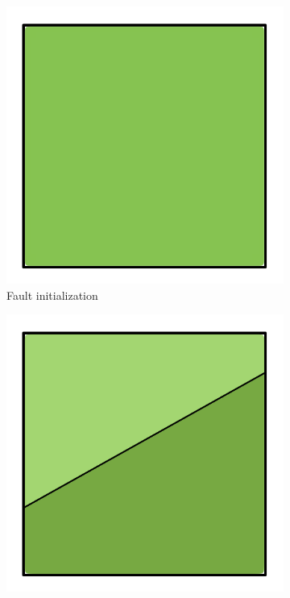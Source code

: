 \documentclass[11pt,a4paper,twoside,openright]{report}
\begin{document}
\begin{figure}[h]
  \centering
  \begin{subfigure}[b]{0.24\textwidth}
    \includegraphics[width=\textwidth]{fault0.png}
    \caption{Fault initialization}
    \label{fig:fault0}
  \end{subfigure}
  \begin{subfigure}[b]{0.24\textwidth}
    \includegraphics[width=\textwidth]{fault2.png}

\end{subfigure}
\end{figure}
\end{document}
